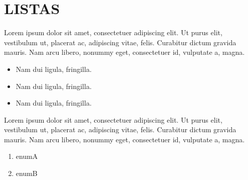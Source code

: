 \section {LISTAS}
 Lorem ipsum dolor sit amet, consectetuer adipiscing elit. Ut purus elit, vestibulum ut, placerat ac, adipiscing vitae, felis. Curabitur dictum gravida mauris. Nam arcu libero, nonummy eget, consectetuer id, vulputate a, magna.

\begin{itemize}
\item Nam dui ligula, fringilla.
\item Nam dui ligula, fringilla.
\item Nam dui ligula, fringilla.
\end{itemize}

Lorem ipsum dolor sit amet, consectetuer adipiscing elit. Ut purus elit, vestibulum ut, placerat ac, adipiscing vitae, felis. Curabitur dictum gravida mauris. Nam arcu libero, nonummy eget, consectetuer id, vulputate a, magna.

\begin{enumerate}
 \item enumA
 \item enumB
\end{enumerate}
